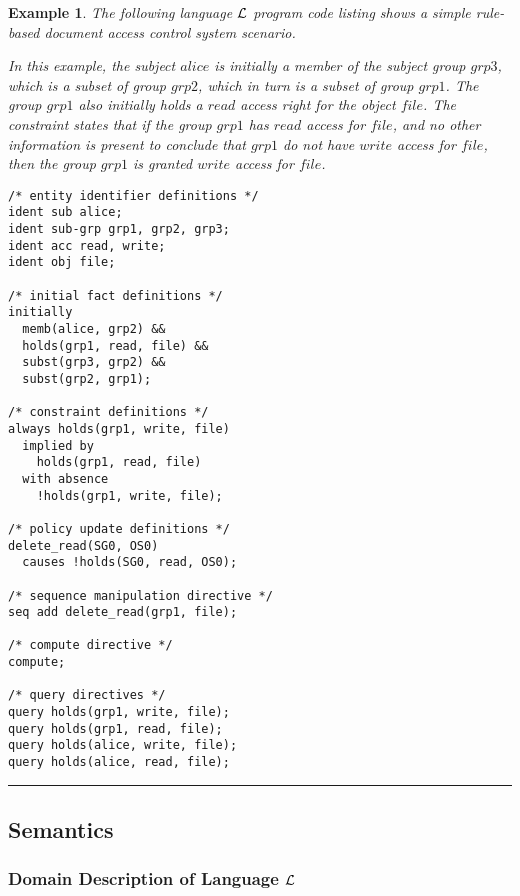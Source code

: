 \documentclass[10pt, twocolumn]{article}
\newtheorem{examp}{Example}
\newenvironment{example}{\begin{examp}\rm}{\rule{2mm}{2mm}\end{examp}}
\begin{document}
        \begin{example}
          \label{ex-1}
          The following language ${\cal L}$ program code listing shows a simple
          rule-based document access control system scenario.

          In this example, the subject $alice$ is initially a member of the
          subject group $grp3$, which is a subset of group $grp2$, which in
          turn is a subset of group $grp1$. The group $grp1$ also initially
          holds a $read$ access right for the object $file$. The constraint
          states that if the group $grp1$ has $read$ access for $file$, and no
          other information is present to conclude that $grp1$ do not have
          $write$ access for $file$, then the group $grp1$ is granted $write$
          access for $file$.

          \begin{verbatim}
/* entity identifier definitions */
ident sub alice;
ident sub-grp grp1, grp2, grp3;
ident acc read, write;
ident obj file;

/* initial fact definitions */
initially
  memb(alice, grp2) &&
  holds(grp1, read, file) &&
  subst(grp3, grp2) &&
  subst(grp2, grp1);

/* constraint definitions */
always holds(grp1, write, file)
  implied by
    holds(grp1, read, file)
  with absence
    !holds(grp1, write, file);

/* policy update definitions */
delete_read(SG0, OS0)
  causes !holds(SG0, read, OS0);

/* sequence manipulation directive */
seq add delete_read(grp1, file);

/* compute directive */
compute;

/* query directives */
query holds(grp1, write, file);
query holds(grp1, read, file);
query holds(alice, write, file);
query holds(alice, read, file);
          \end{verbatim}
        \end{example}

    \subsection{Semantics}

      \subsubsection{Domain Description of Language ${\cal L}$}
\end{document}
